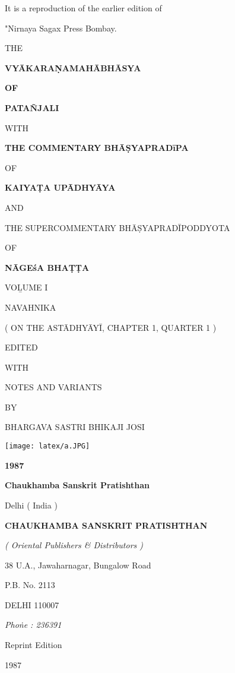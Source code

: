 \documentclass[11pt, openany]{book}
\begin{document}
\newpage
\thispagestyle{empty}
It is a reproduction of the earlier edition of 

"Nirnaya Sagax Press Bombay. 

\begin{center}
THE

\textbf{\huge VYĀKARAṆAMAHĀBHĀSYA}

\textbf{OF}

\textbf{\Large PATAÑJALI}

WITH

\textbf{THE COMMENTARY BHĀṢYAPRADīPA}

OF

\textbf{\large KAIYAṬA UPĀDHYĀYA}

AND 

THE SUPERCOMMENTARY BHĀṢYAPRADĪPODDYOTA 

OF 

\textbf{NĀGEśA BHAṬṬA}

\vspace{3mm}
VOḺUME I

NAVAHNIKA

 ( ON THE ASTĀDHYĀYĪ, CHAPTER 1, QUARTER 1 ) 

\vspace{3mm}
EDITED

WITH

NOTES AND VARIANTS

BY

BHARGAVA SASTRI BHIKAJI JOSI

\vspace{15mm}
\texttt{[image: latex/a.JPG]}

\textbf{1987}

\textbf{\large Chaukhamba Sanskrit Pratishthan}

Delhi ( India ) 
\end{center}

\newpage
\thispagestyle{empty}
\begin{center}
\textbf{\Large CHAUKHAMBA SANSKRIT PRATISHTHAN}

\emph{\en ( Oriental Publishers \& Distributors ) }

38 U.A., Jawaharnagar, Bungalow Road 

P.B. No. 2113 

{\large DELHI 110007}

\emph{\en Phoṅe : 236391}

\vspace{35mm}

Reprint Edition 

1987
\end{center}
\end{document}
